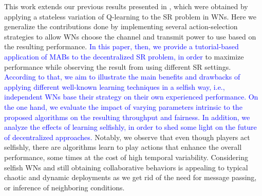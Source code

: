 \documentclass[preprint,12pt]{elsarticle}
\newcommand{\francesc}[1]{\textcolor{blue}{#1}}
\newcommand{\francesco}[1]{\textcolor{orange}{#1}}
\begin{document}
This work extends our previous results presented in \cite{wilhelmi2017implications}, which were obtained by applying a stateless variation of Q-learning to the SR problem in WNs. Here we generalize the contributions done by implementing several action-selection strategies to allow WNs choose the channel and transmit power to use based on the resulting performance. \francesc{In this paper, then, we provide a tutorial-based application of MABs to the decentralized SR problem, in order} to maximize performance while observing the result from using different SR settings. \francesc{According to that, we aim to illustrate the main benefits and drawbacks of applying different well-known learning techniques in a selfish way, i.e., independent WNs base their strategy on their own experienced performance. On the one hand, we evaluate the impact of varying parameters intrinsic to the proposed algorithms on the resulting throughput and fairness. In addition, we analyze the effects of learning selfishly, in order to shed some light on the future of decentralized approaches.} Notably, we observe that even though players act selfishly, there are algorithms %
learn to play actions that enhance the overall performance, some times at the cost of high temporal variability. Considering selfish WNs and still obtaining collaborative behaviors is appealing to typical chaotic and dynamic deployments as we get rid of the need for message passing, or inference of neighboring conditions. 
\end{document}
